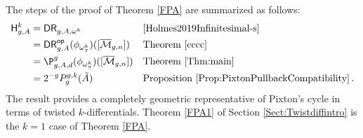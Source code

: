 The steps of the proof of Theorem \ref{FPA} are summarized as follows:
\begin{align*}
    \mathsf{H}^k_{g,A}&=\mathsf{DR}_{g,A, \omega^k} &&\cite[\text{Theorem }1.1]{Holmes2019Infinitesimal-s}\\
    &=\mathsf{DR}^{\mathsf{op}}_{g,A}(\phi_{\omega_\pi^k})([\overline{\mathcal{M}}_{g,n}]) &&\text{Theorem }\ref{cccc}\\
    &=\P_{g,A,d}^g(\phi_{\omega_\pi^k})([\overline{\mathcal{M}}_{g,n}]) &&\text{Theorem }\ref{Thm:main}\\
    &=2^{-g} P_g^{g,k}(\tilde A) &&\text{Proposition }\ref{Prop:PixtonPullbackCompatibility}\, .
\end{align*}
The result provides a completely geometric representative
of Pixton's cycle in terms of twisted $k$-differentials.
Theorem \ref{FPA1} of Section \ref{Sect:Twistdiffintro} is the $k=1$ case of
Theorem \ref{FPA}.



